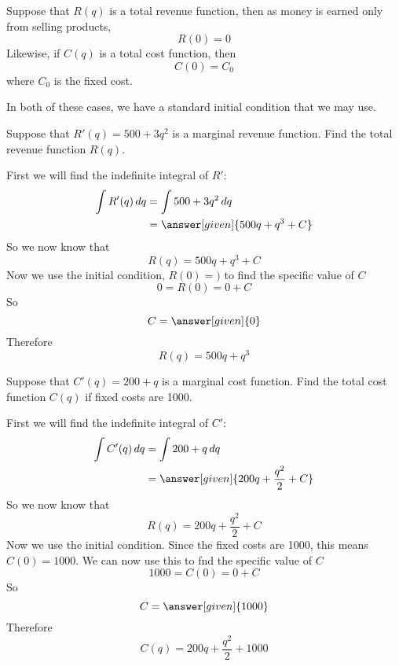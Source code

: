 \documentclass{ximera}
\begin{document}
Suppose that $R(q)$ is a total revenue function, then as money is earned only from selling products,
$$R(0)=0$$
Likewise, if $C(q)$ is a total cost function, then 
$$C(0)=C_{0}$$
where $C_{0}$ is the fixed cost. 

In both of these cases, we have a standard initial condition that we may use.

\begin{example}
Suppose that $R'(q)=500+3q^{2}$ is a marginal revenue function. Find the total revenue function $R(q)$.
\begin{explanation}
First we will find the indefinite integral of $R'$:
\begin{align*}
\int R'(q) \d q &= \int 500+3q^{2} \d q\\
&= \answer[given]{500q+q^{3}+C}
\end{align*}
So we now know that 
$$R(q)=500q+q^{3}+C$$
Now we use the initial condition, $R(0)=)$ to find the specific value of $C$
$$0=R(0)=0+C$$
So
$$C= \answer[given]{0}$$
Therefore
$$R(q)=500q+q^{3}$$
\end{explanation}
\end{example}

\begin{example}
Suppose that $C'(q)=200+q$ is a marginal cost function. Find the total cost function $C(q)$ if fixed costs are 1000.
\begin{explanation}
First we will find the indefinite integral of $C'$:
\begin{align*}
\int C'(q) \d q &= \int 200+q \d q\\
&= \answer[given]{200q+\frac{q^{2}}{2}+C}
\end{align*}
So we now know that 
$$R(q)=200q+\frac{q^{2}}{2}+C$$
Now we use the initial condition. Since the fixed costs are 1000, this means $C(0)=1000$. We can 
now use this to fnd the specific value of $C$
$$1000=C(0)=0+C$$
So
$$C= \answer[given]{1000}$$
Therefore
$$C(q)=200q+\frac{q^{2}}{2}+1000$$
\end{explanation}
\end{example}
\end{document}
